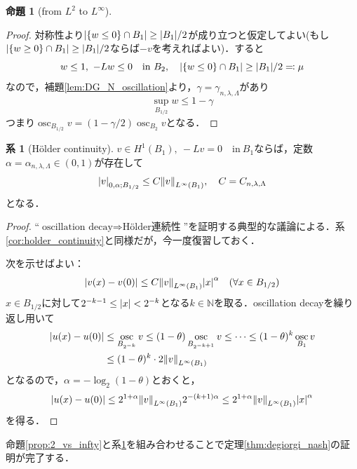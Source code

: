 \documentclass[a4paper]{ltjsarticle}
\newcommand{\Nset}{\mathbb{N}}
\newcommand{\inn}{\quad\text{in}\ }
\newcommand{\1}{\mathbbm{1}}
\DeclareMathOperator*{\osc}{\mathrm{osc}}
\numberwithin{equation}{section}
\theoremstyle{definition}
\newtheorem{cor}[thm]{系}
\newtheorem{prop}[thm]{命題}
\begin{document}
\begin{prop}[from $L^2$ to $L^\infty$]
\begin{proof}
    対称性より$\abs{\qty{w\leq 0}\cap B_1}\geq \abs{B_1}/2$が成り立つと仮定してよい(もし$\abs{\qty{w\geq 0}\cap B_1}\geq \abs{B_1}/2$ならば$-v$を考えればよい)．すると
    \begin{equation}
        w\leq 1,\ -Lw\leq0\inn B_2,\quad \abs{\qty{w\leq0}\cap B_1}\geq \abs{B_1}/2\eqqcolon \mu 
    \end{equation}
    なので，補題\ref{lem:DG_N_oscillation}より，$\gamma=\gamma_{n,\lambda,\Lambda}$があり
    \begin{equation}
        \sup_{B_{1/2}}w\leq 1-\gamma 
    \end{equation}
    つまり$\osc_{B_{1/2}}v=(1-\gamma/2)\osc_{B_{2}}v$となる．
\end{proof}
\begin{cor}[Hölder continuity]\label{cor:DG_N_holder_continuity}
    $v\in H^1(B_1),\ -Lv=0\inn B_1$ならば，定数$\alpha=\alpha_{n,\lambda,\Lambda}\in(0,1)$が存在して
    \begin{equation}
        \abs{v}_{0,\alpha;B_{1/2}}\leq C\norm{v}_{L^\infty(B_1)},\quad C=C_{n,\lambda,\Lambda}
    \end{equation}
    となる．
\end{cor}
\begin{proof}
    ``$\text{oscillation decay}\Longrightarrow\text{Hölder連続性}$''を証明する典型的な議論による．系\ref{cor:holder_continuity}と同様だが，今一度復習しておく．

    次を示せばよい：
    \begin{equation}
        \abs{v(x)-v(0)}\leq C\norm{v}_{L^\infty(B_1)}\abs{x}^{\alpha}\quad (\forall x\in B_{1/2})
    \end{equation}
    $x\in B_{1/2}$に対して$2^{-k-1}\leq \abs{x}<2^{-k}$となる$k\in\Nset$を取る．oscillation decayを繰り返し用いて
    \begin{align}
        \abs{u(x)-u(0)}&\leq \osc_{B_{2^{-k}}}v\leq(1-\theta)\osc_{B_{2^{-k+1}}}v\leq\cdots\leq (1-\theta)^k\osc_{B_1}v\\
        &\leq (1-\theta)^k\cdot 2\norm{v}_{L^\infty(B_1)}
    \end{align}
    となるので，$\alpha=-\log_2(1-\theta)$とおくと，
    \begin{equation}
        \abs{u(x)-u(0)}\leq 2^{1+\alpha}\norm{v}_{L^\infty(B_1)} 2^{-(k+1)\alpha}\leq 2^{1+\alpha}\norm{v}_{L^\infty(B_1)} \abs{x}^{\alpha}
    \end{equation}
    を得る．
\end{proof}
命題\ref{prop:2_vs_infty}と系\ref{cor:DG_N_holder_continuity}を組み合わせることで定理\ref{thm:degiorgi_nash}の証明が完了する．

\end{prop}
\end{document}
